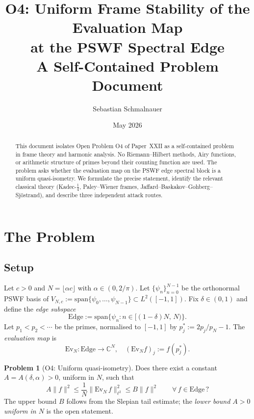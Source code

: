 \documentclass[12pt,a4paper]{amsart}
\title{O4: Uniform Frame Stability of the Evaluation Map\\
at the PSWF Spectral Edge\\
{\normalsize A Self-Contained Problem Document}}
\author{Sebastian Schmalnauer}
\date{May 2026}
\theoremstyle{definition}
\newtheorem{problem}[theorem]{Problem}
\newcommand{\Ev}{\mathrm{Ev}_N}
\newcommand{\Edge}{\mathrm{Edge}}
\newcommand{\norm}[1]{\|#1\|}
\begin{document}
\maketitle

\begin{abstract}
This document isolates Open Problem O4 of Paper~XXII as a
self-contained problem in frame theory and harmonic analysis.
No Riemann--Hilbert methods, Airy functions, or arithmetic
structure of primes beyond their counting function are used.
The problem asks whether the evaluation map on the PSWF edge
spectral block is a uniform quasi-isometry.
We formulate the precise statement, identify the
relevant classical theory (Kadec-$\tfrac{1}{4}$, Paley--Wiener frames,
Jaffard--Baskakov--Gohberg--Sjöstrand), and describe three
independent attack routes.
\end{abstract}

\tableofcontents

\section{The Problem}
\label{sec:problem}

\subsection{Setup}

Let $c > 0$ and $N = \lfloor \alpha c \rfloor$ with $\alpha \in (0, 2/\pi)$.
Let $\{\psi_n\}_{n=0}^{N-1}$ be the orthonormal PSWF basis of
$V_{N,c} := \mathrm{span}\{\psi_0,\ldots,\psi_{N-1}\} \subset L^2([-1,1])$.
Fix $\delta \in (0,1)$ and define the \emph{edge subspace}
\[
  \Edge := \mathrm{span}\{\psi_n : n \in [(1-\delta)N,\, N)\}.
\]
Let $p_1 < p_2 < \cdots$ be the primes, normalised to $[-1,1]$
by $p_j^* := 2p_j/p_N - 1$.
The \emph{evaluation map} is
\[
  \Ev : \Edge \to \mathbb{C}^N,
  \quad
  (\Ev f)_j := f(p_j^*).
\]

\begin{problem}[O4: Uniform quasi-isometry]\label{prob:O4}
Does there exist a constant $A = A(\delta, \alpha) > 0$,
uniform in $N$, such that
\begin{equation}\label{eq:O4}
  A \norm{f}^2
  \le \frac{1}{N}\norm{\Ev\,f}_{\ell^2}^2
  \le B\norm{f}^2
  \qquad \forall\, f \in \Edge\,?
\end{equation}
The upper bound $B$ follows from the Slepian tail estimate;
the \emph{lower bound $A > 0$ uniform in $N$} is the open statement.
\end{problem}
\end{document}
